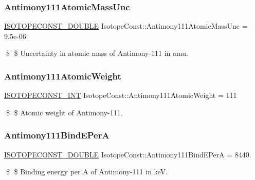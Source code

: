 \subsubsection{\texorpdfstring{Antimony111\+Atomic\+Mass\+Unc}{Antimony111AtomicMassUnc}}
{\footnotesize\ttfamily \mbox{\hyperlink{group___isotope_const-_macros_ga8f45a7272ce02c0b4c65c44636ed719a}{I\+S\+O\+T\+O\+P\+E\+C\+O\+N\+S\+T\+\_\+\+D\+O\+U\+B\+LE}} Isotope\+Const\+::\+Antimony111\+Atomic\+Mass\+Unc = 9.\+5e-\/06}

\$ \$ Uncertainty in atomic mass of Antimony-\/111 in amu. \mbox{\label{group___isotope_const-_antimony-_sb111_gac936cd04793e9fc9a750ecf134638c95}} 
\subsubsection{\texorpdfstring{Antimony111\+Atomic\+Weight}{Antimony111AtomicWeight}}
{\footnotesize\ttfamily \mbox{\hyperlink{group___isotope_const-_macros_ga5f18360b3e99483a35c32d789e62621c}{I\+S\+O\+T\+O\+P\+E\+C\+O\+N\+S\+T\+\_\+\+I\+NT}} Isotope\+Const\+::\+Antimony111\+Atomic\+Weight = 111}

\$ \$ Atomic weight of Antimony-\/111. \mbox{\label{group___isotope_const-_antimony-_sb111_ga36a910fd8ad2a5274db6572fedcc3919}} 
\subsubsection{\texorpdfstring{Antimony111\+Bind\+E\+PerA}{Antimony111BindEPerA}}
{\footnotesize\ttfamily \mbox{\hyperlink{group___isotope_const-_macros_ga8f45a7272ce02c0b4c65c44636ed719a}{I\+S\+O\+T\+O\+P\+E\+C\+O\+N\+S\+T\+\_\+\+D\+O\+U\+B\+LE}} Isotope\+Const\+::\+Antimony111\+Bind\+E\+PerA = 8440.}

\$ \$ Binding energy per A of Antimony-\/111 in keV. \mbox{\label{group___isotope_const-_antimony-_sb111_ga38ccd6335c030e6f8786ac2b92e3c90a}} 

